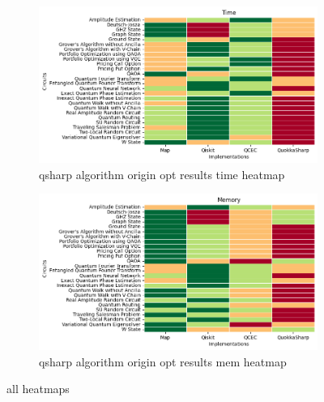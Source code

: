 
    \begin{figure}
    \centering
    \begin{subfigure}{.5\textwidth}
      \centering
      \includegraphics[width=1\linewidth]{benchmarks/./qsharp/all/algorithm/qsharp_algorithm_origin_opt_results_time_heatmap.png}
      \caption{qsharp algorithm origin opt results time heatmap}
      \label{fig:gensets_qsharp_algorithm_origin_opt_results_time_heatmap}
    \end{subfigure}
    \begin{subfigure}{.5\textwidth}
      \centering
      \includegraphics[width=1\linewidth]{benchmarks/./qsharp/all/algorithm/qsharp_algorithm_origin_opt_results_mem_heatmap.png}
      \caption{qsharp algorithm origin opt results mem heatmap}
      \label{fig:gensets_qsharp_algorithm_origin_opt_results_mem_heatmap}
    \end{subfigure}
    \caption{all heatmaps}
    \label{fig:gensets_qsharp_algorithm_origin_opt_results_heatmaps}
    \end{figure}
    